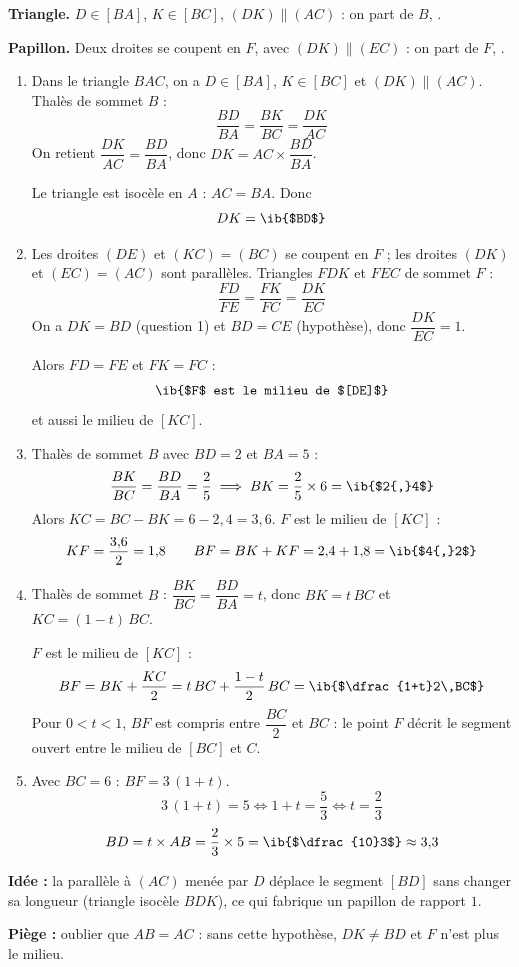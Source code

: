 \begin{prop}
\textbf{Triangle.} $D\in[BA]$, $K\in[BC]$, $(DK)\parallel(AC)$ : on part de $B$, .

\textbf{Papillon.} Deux droites se coupent en $F$, avec $(DK)\parallel(EC)$ : on part de $F$, .
\end{prop}
\begin{enumerate}
  \item Dans le triangle $BAC$, on a $D\in[BA]$, $K\in[BC]$ et $(DK)\parallel(AC)$. Thalès de sommet $B$ :
  \[\dfrac{BD}{BA}=\dfrac{BK}{BC}=\dfrac{DK}{AC}\]
  On retient $\dfrac{DK}{AC}=\dfrac{BD}{BA}$, donc $DK=AC\times\dfrac{BD}{BA}$.

  Le triangle est isocèle en $A$ : $AC=BA$. Donc
  \[DK=\ib{$BD$}\]

  \item Les droites $(DE)$ et $(KC)=(BC)$ se coupent en $F$ ; les droites $(DK)$ et $(EC)=(AC)$ sont parallèles. Triangles $FDK$ et $FEC$ de sommet $F$ :
  \[\dfrac{FD}{FE}=\dfrac{FK}{FC}=\dfrac{DK}{EC}\]
  On a $DK=BD$ (question 1) et $BD=CE$ (hypothèse), donc $\dfrac{DK}{EC}=1$.

  Alors $FD=FE$ et $FK=FC$ :
  \[\ib{$F$ est le milieu de $[DE]$}\]
  et aussi le milieu de $[KC]$.

  \item Thalès de sommet $B$ avec $BD=2$ et $BA=5$ :
  \[\dfrac{BK}{BC}=\dfrac{BD}{BA}=\dfrac25\implies BK=\dfrac25\times6=\ib{$2{,}4$}\]
  Alors $KC=BC-BK=6-2{,}4=3{,}6$. $F$ est le milieu de $[KC]$ :
  \[KF=\dfrac{3{,}6}2=1{,}8\qquad BF=BK+KF=2{,}4+1{,}8=\ib{$4{,}2$}\]

  \item Thalès de sommet $B$ : $\dfrac{BK}{BC}=\dfrac{BD}{BA}=t$, donc $BK=t\,BC$ et $KC=(1-t)\,BC$.

  $F$ est le milieu de $[KC]$ :
  \[BF=BK+\dfrac{KC}2=t\,BC+\dfrac{1-t}2\,BC=\ib{$\dfrac{1+t}2\,BC$}\]
  Pour $0<t<1$, $BF$ est compris entre $\dfrac{BC}2$ et $BC$ : le point $F$ décrit le segment ouvert entre le milieu de $[BC]$ et $C$.

  \item Avec $BC=6$ : $BF=3\,(1+t)$.
  \[3\,(1+t)=5\iff1+t=\dfrac53\iff t=\dfrac23\]
  \[BD=t\times AB=\dfrac23\times5=\ib{$\dfrac{10}3$}\approx3{,}3\]
\end{enumerate}
\textbf{Idée :} la parallèle à $(AC)$ menée par $D$ déplace le segment $[BD]$ sans changer sa longueur (triangle isocèle $BDK$), ce qui fabrique un papillon de rapport $1$.

\textbf{Piège :} oublier que $AB=AC$ : sans cette hypothèse, $DK\neq BD$ et $F$ n'est plus le milieu.
